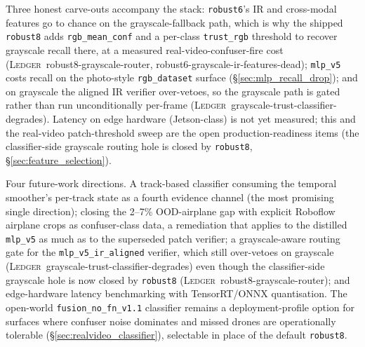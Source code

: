 \documentclass[12pt,a4paper,oneside,openright]{book}
\begin{document}
Three honest carve-outs accompany the stack: \texttt{robust6}'s IR and cross-modal features go to chance on the grayscale-fallback path, which is why the shipped \texttt{robust8} adds \texttt{rgb\_mean\_conf} and a per-class \texttt{trust\_rgb} threshold to recover grayscale recall there, at a measured real-video-confuser-fire cost (\textsc{Ledger}~robust8-grayscale-router, robust6-grayscale-ir-features-dead); \texttt{mlp\_v5} costs recall on the photo-style \texttt{rgb\_dataset} surface (\S\ref{sec:mlp_recall_drop}); and on grayscale the aligned IR verifier over-vetoes, so the grayscale path is gated rather than run unconditionally per-frame (\textsc{Ledger}~grayscale-trust-classifier-degrades). Latency on edge hardware (Jetson-class) is not yet measured; this and the real-video patch-threshold sweep are the open production-readiness items (the classifier-side grayscale routing hole is closed by \texttt{robust8}, \S\ref{sec:feature_selection}).

Four future-work directions. A track-based classifier consuming the temporal smoother's per-track state as a fourth evidence channel (the most promising single direction); closing the 2--7\% OOD-airplane gap with explicit Roboflow airplane crops as confuser-class data, a remediation that applies to the distilled \texttt{mlp\_v5} as much as to the superseded patch verifier; a grayscale-aware routing gate for the \texttt{mlp\_v5\_ir\_aligned} verifier, which still over-vetoes on grayscale (\textsc{Ledger}~grayscale-trust-classifier-degrades) even though the classifier-side grayscale hole is now closed by \texttt{robust8} (\textsc{Ledger}~robust8-grayscale-router); and edge-hardware latency benchmarking with TensorRT/ONNX quantisation. The open-world \texttt{fusion\_no\_fn\_v1.1} classifier remains a deployment-profile option for surfaces where confuser noise dominates and missed drones are operationally tolerable (\S\ref{sec:realvideo_classifier}), selectable in place of the default \texttt{robust8}.

\appendix
\end{document}
